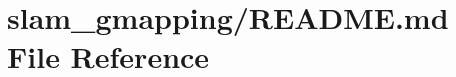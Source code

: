 \hypertarget{slam__gmapping_2README_8md}{}\section{slam\+\_\+gmapping/\+R\+E\+A\+D\+ME.md File Reference}
\label{slam__gmapping_2README_8md}
